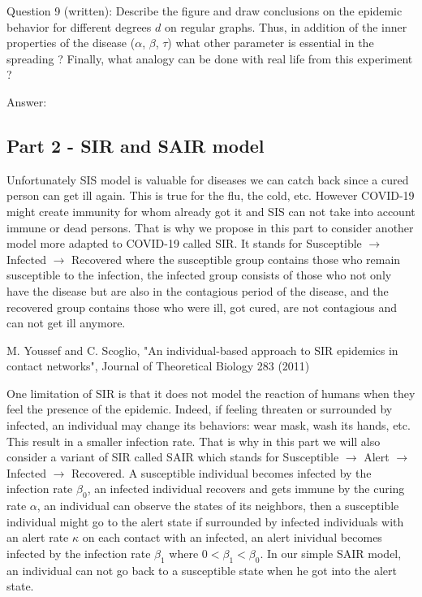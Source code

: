 \documentclass[11pt]{article}
\begin{document}
    Question 9 (written): Describe the figure and draw conclusions on the
epidemic behavior for different degrees \(d\) on regular graphs. Thus,
in addition of the inner properties of the disease (\(\alpha\),
\(\beta\), \(\tau\)) what other parameter is essential in the spreading
? Finally, what analogy can be done with real life from this experiment
?

Answer:

    \subsection{Part 2 - SIR and SAIR
model}\label{part-2---sir-and-sair-model}

Unfortunately SIS model is valuable for diseases we can catch back since
a cured person can get ill again. This is true for the flu, the cold,
etc. However COVID-19 might create immunity for whom already got it and
SIS can not take into account immune or dead persons. That is why we
propose in this part to consider another model more adapted to COVID-19
called SIR. It stands for Susceptible \(\rightarrow\) Infected
\(\rightarrow\) Recovered where the susceptible group contains those who
remain susceptible to the infection, the infected group consists of
those who not only have the disease but are also in the contagious
period of the disease, and the recovered group contains those who were
ill, got cured, are not contagious and can not get ill anymore.

M. Youssef and C. Scoglio, "An individual-based approach to SIR
epidemics in contact networks", Journal of Theoretical Biology 283
(2011)

One limitation of SIR is that it does not model the reaction of humans
when they feel the presence of the epidemic. Indeed, if feeling threaten
or surrounded by infected, an individual may change its behaviors: wear
mask, wash its hands, etc. This result in a smaller infection rate. That
is why in this part we will also consider a variant of SIR called SAIR
which stands for Susceptible \(\rightarrow\) Alert \(\rightarrow\)
Infected \(\rightarrow\) Recovered. A susceptible individual becomes
infected by the infection rate \(\beta_0\), an infected individual
recovers and gets immune by the curing rate \(\alpha\), an individual
can observe the states of its neighbors, then a susceptible individual
might go to the alert state if surrounded by infected individuals with
an alert rate \(\kappa\) on each contact with an infected, an alert
inividual becomes infected by the infection rate \(\beta_1\) where
\(0<\beta_1<\beta_0\). In our simple SAIR model, an individual can not
go back to a susceptible state when he got into the alert state.
\end{document}
